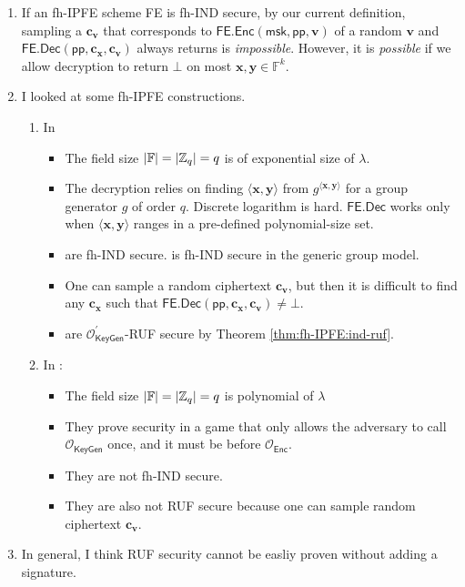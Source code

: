 \begin{enumerate}

\item If an fh-IPFE scheme \textsf{FE} is fh-IND secure, by our current definition, sampling a $\mathbf{c_v}$ that corresponds to $\textsf{FE.Enc}(\textsf{msk}, \textsf{pp}, \mathbf{v})$ of a random $\mathbf{v}$ and $\textsf{FE.Dec}(\textsf{pp}, \mathbf{c_x}, \mathbf{c_v})$ always returns is \emph{impossible}. However, it is \emph{possible} \cite{cryptoeprint:2015/1255, 10.1007/978-3-319-45871-7_24, cryptoeprint:2016/440} if we allow decryption to return $\bot$ on most $\mathbf{x}, \mathbf{y} \in \mathbb{F}^k$.
\item I looked at some fh-IPFE constructions.

\begin{enumerate}

	\item In \cite{cryptoeprint:2015/1255, 10.1007/978-3-319-45871-7_24, cryptoeprint:2016/440}
	\begin{itemize}
		\item The field size $|\mathbb{F}| = |\mathbb{Z}_q| = q$ is of exponential size of $\lambda$.
		\item The decryption relies on finding $\langle \mathbf{x}, \mathbf{y} \rangle$ from $g^{\langle \mathbf{x}, \mathbf{y} \rangle}$ for a group generator $g$ of order $q$. Discrete logarithm is hard. $\textsf{FE.Dec}$ works only when $\langle \mathbf{x}, \mathbf{y} \rangle$ ranges in a pre-defined polynomial-size set.
		\item \cite{cryptoeprint:2015/1255, 10.1007/978-3-319-45871-7_24} are fh-IND secure. \cite{cryptoeprint:2016/440} is fh-IND secure in the generic group model.
		\item One can sample a random ciphertext $\mathbf{c_v}$, but then it is difficult to find any $\mathbf{c_x}$ such that $\textsf{FE.Dec}(\textsf{pp}, \mathbf{c_x}, \mathbf{c_v}) \neq \bot$. 
		\item \cite{cryptoeprint:2015/1255, cryptoeprint:2016/440} are $\mathcal{O}_\textsf{KeyGen}^\prime$-RUF secure by Theorem \ref{thm:fh-IPFE:ind-ruf}.
	\end{itemize}

	\item In \cite{cryptoeprint:2018/1214, 10.1007/978-3-030-90567-5_33}:
	\begin{itemize}
		\item The field size $|\mathbb{F}| = |\mathbb{Z}_q| = q$ is polynomial of $\lambda$
		\item They prove security in a game that only allows the adversary to call $\mathcal{O}_\textsf{KeyGen}$ once, and it must be before $\mathcal{O}_\textsf{Enc}$.
		\item They are not fh-IND secure.
		\item They are also not RUF secure because one can sample random ciphertext $\mathbf{c_v}$.
	\end{itemize}
\end{enumerate}

\item In general, I think RUF security cannot be easliy proven without adding a signature.

\end{enumerate}
